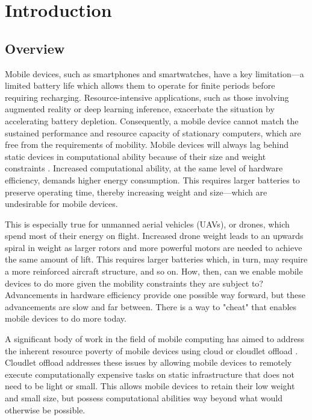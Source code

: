 \chapter{Introduction}
\section{Overview}
\label{sec:overview}
Mobile devices, such as smartphones and smartwatches, have a key limitation---a
limited battery life which allows them to operate for finite periods before
requiring recharging.  Resource-intensive applications, such as those involving
augmented reality or deep learning inference, exacerbate the situation by
accelerating battery depletion.  Consequently, a mobile device cannot match the
sustained performance and resource capacity of stationary computers, which are
free from the requirements of mobility. Mobile devices will always lag behind
static devices in computational ability because of their size and weight
constraints \cite{satya2014}. Increased computational ability, at the same
level of hardware efficiency, demands higher energy consumption. This requires
larger batteries to preserve operating time, thereby increasing weight and
size---which are undesirable for mobile devices.

This is especially true for unmanned aerial vehicles (UAVs), or drones, which
spend most of their energy on flight.  Increased drone weight leads to an
upwards spiral in weight as larger rotors and more powerful motors are needed
to achieve the same amount of lift.  This requires larger batteries which, in
turn, may require a more reinforced aircraft structure, and so on. How, then,
can we enable mobile devices to do more given the mobility constraints they are
subject to? Advancements in hardware efficiency provide one possible way
forward, but these advancements are slow and far between. There is
a way to "cheat" that enables mobile devices to do more today.

A significant body of work in the field of mobile computing has aimed to
address the inherent resource poverty of mobile devices using cloud or
cloudlet offload \cite{satya1996,satya2009}.  Cloudlet offload addresses these
issues by allowing mobile devices to remotely execute computationally expensive
tasks on static infrastructure that does not need to be light or small. This
allows mobile devices to retain their low weight and small size, but possess
computational abilities way beyond what would otherwise be possible.

